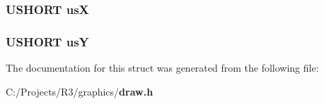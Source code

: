 \subsubsection[{usX}]{\setlength{\rightskip}{0pt plus 5cm}USHORT {\bf usX}}\label{struct_d_r_a_w___e_l_l_i_p_s_e___s_t_r_u_c_t_a6ead387c0c38c4f3f98aac147733a602}
\subsubsection[{usY}]{\setlength{\rightskip}{0pt plus 5cm}USHORT {\bf usY}}\label{struct_d_r_a_w___e_l_l_i_p_s_e___s_t_r_u_c_t_aeb96aa8e26a2ce680ec0e55e40f33a44}


The documentation for this struct was generated from the following file:\begin{DoxyCompactItemize}
\item 
C:/Projects/R3/graphics/{\bf draw.h}\end{DoxyCompactItemize}
